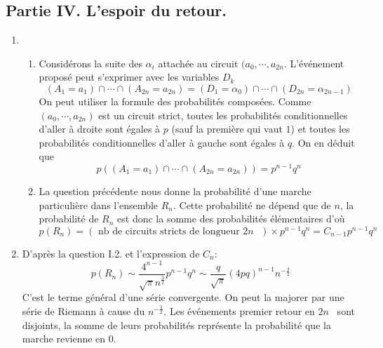 \subsection*{Partie IV. L'espoir du retour.}
\begin{enumerate}
  \item 
\begin{enumerate}
  \item Considérons la suite des $\alpha_i$ attachée au circuit $(a_0,\cdots,a_{2n}$. L'événement proposé peut s'exprimer avec les variables $D_k$
\begin{displaymath}
(A_1=a_1)\cap \cdots \cap (A_{2n}=a_{2n}) = (D_1=\alpha_0)\cap \cdots \cap (D_{2n}=\alpha_{2n-1})  
\end{displaymath}
On peut utiliser la formule des probabilités composées. Comme $(a_0,\cdots,a_{2n})$ est un circuit strict, toutes les probabilités conditionnelles d'aller à droite sont égales à $p$ (sauf la première qui vaut $1$) et toutes les probabilités conditionnelles d'aller à gauche sont égales à $q$. On en déduit que 
\begin{displaymath}
p\left( (A_1=a_1)\cap \cdots \cap (A_{2n}=a_{2n})\right)  = p^{n-1}q^{n}  
\end{displaymath}

  \item La question précédente nous donne la probabilité d'une marche particulière dans l'ensemble $R_n$. Cette probabilité ne dépend que de $n$, la probabilité de $R_n$ est donc la somme des probabilités élémentaires d'où
\begin{displaymath}
p(R_n) = \left( \text{ nb de circuits stricts de longueur $2n$ }\right)\times p^{n-1}q^{n}
=C_{n-1}p^{n-1}q^{n}
\end{displaymath}
\end{enumerate}

\item D'après la question I.2. et l'expression de $C_n$:
\begin{displaymath}
  p(R_n) \sim \frac{4^{n-1}}{\sqrt{\pi}n^{\frac{3}{2}}}p^{n-1}q^{n} 
\sim \frac{q}{\sqrt{\pi}}(4pq)^{n-1}n^{-\frac{3}{2}}
\end{displaymath}
C'est le terme général d'une série convergente. On peut la majorer par une série de Riemann à cause du $n^{-\frac{3}{2}}$.\newline
Les événements \og premier retour en $2n$\fg ~ sont disjoints, la somme de leurs probabilités représente la probabilité que la marche revienne en $0$.


\end{enumerate}
